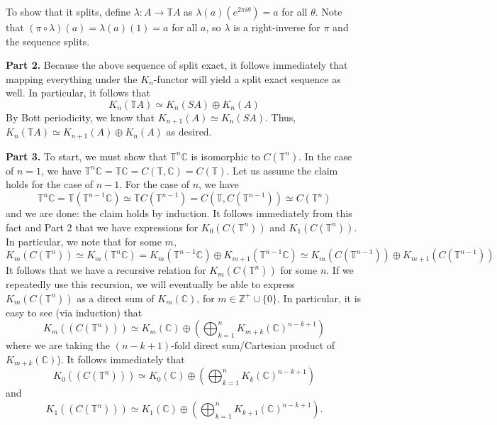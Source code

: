 \documentclass[aps,pra,showpacs,notitlepage,onecolumn,superscriptaddress,nofootinbib]{revtex4-1}
\theoremstyle{definition}
\begin{document}
\noindent To show that it splits, define $\lambda : A \rightarrow \mathbb{T} A$ as $\lambda(a)(e^{2 \pi i \theta}) = a$ for all $\theta$.
Note that $(\pi \circ \lambda)(a) = \lambda(a)(1) = a$ for all $a$, so $\lambda$ is a right-inverse for $\pi$ and the sequence splits.
\newline

\noindent \textbf{Part 2.} Because the above sequence of split exact, it follows immediately that mapping everything under the $K_n$-functor
will yield a split exact sequence as well. In particular, it follows that
\begin{equation}
  K_n(\mathbb{T} A) \simeq K_n(SA) \oplus K_n(A)
\end{equation}
By Bott periodicity, we know that $K_{n + 1}(A) \simeq K_n(SA)$. Thus, $K_n(\mathbb{T} A) \simeq K_{n + 1}(A) \oplus K_n(A)$ as desired.
\newline

\noindent \textbf{Part 3.} To start, we must show that $\mathbb{T}^n \mathbb{C}$ is isomorphic to $C(\mathbb{T}^n)$. In the case of $n = 1$,
we have $\mathbb{T}^n \mathbb{C} = \mathbb{T} \mathbb{C} = C(\mathbb{T}, \mathbb{C}) = C(\mathbb{T})$. Let us assume the claim
holds for the case of $n - 1$. For the case of $n$, we have
\begin{equation}
  \mathbb{T}^n \mathbb{C} = \mathbb{T}(\mathbb{T}^{n - 1} \mathbb{C}) \simeq \mathbb{T} C(\mathbb{T}^{n - 1}) = C(\mathbb{T}, C(\mathbb{T}^{n - 1})) \simeq C(\mathbb{T}^n)
\end{equation}
and we are done: the claim holds by induction. It follows immediately from this fact and Part 2 that we have expressions for $K_0(C(\mathbb{T}^n))$ and $K_1(C(\mathbb{T}^n))$.
In particular, we note that for some $m$,
\begin{equation}
  K_m(C(\mathbb{T}^n)) \simeq K_m(\mathbb{T}^n \mathbb{C}) = K_{m}(\mathbb{T}^{n - 1} \mathbb{C}) \oplus K_{m + 1}(\mathbb{T}^{n - 1} \mathbb{C}) \simeq K_m(C(\mathbb{T}^{n - 1})) \oplus K_{m + 1}(C(\mathbb{T}^{n - 1}))
\end{equation}
It follows that we have a recursive relation for $K_{m}(C(\mathbb{T}^{n}))$ for some $n$. If we repeatedly use this recursion, we will eventually be able to express $K_m(C(\mathbb{T}^n))$
as a direct sum of $K_m(\mathbb{C})$, for $m \in \mathbb{Z}^{+} \cup \{0\}$. In particular, it is easy to see (via induction) that
\begin{equation}
  K_m((C(\mathbb{T}^n))) \simeq K_{m}(\mathbb{C}) \oplus \left( \bigoplus_{k = 1}^{n} K_{m + k}(\mathbb{C})^{n - k + 1} \right)
\end{equation}
where we are taking the $(n - k + 1)$-fold direct sum/Cartesian product of $K_{m + k}(\mathbb{C})$). It follows immediately that
\begin{equation}
  K_0((C(\mathbb{T}^n))) \simeq K_0(\mathbb{C}) \oplus \left( \bigoplus_{k = 1}^{n} K_{k}(\mathbb{C})^{n - k + 1} \right)
\end{equation}
and
\begin{equation}
  K_1((C(\mathbb{T}^n))) \simeq K_1(\mathbb{C}) \oplus \left( \bigoplus_{k = 1}^{n} K_{k + 1}(\mathbb{C})^{n - k + 1} \right).
\end{equation}
\end{document}
